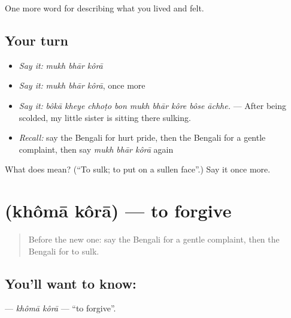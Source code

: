 \begin{grammarlens}[title={What you've built}]
One more word for describing what you lived and felt.
\end{grammarlens}

\subsection*{Your turn}
\begin{itemize}
\raggedright
  \item \emph{Say it:} \emph{mukh bhār kôrā}
  \item \emph{Say it:} \emph{mukh bhār kôrā}, once more
  \item \emph{Say it:} \emph{bôkā kheye chhoṭo bon mukh bhār kôre bôse āchhe.} — After being scolded, my little sister is sitting there sulking.
  \item \emph{Recall:} say the Bengali for hurt pride, then the Bengali for a gentle complaint, then say \emph{mukh bhār kôrā} again
\end{itemize}

\begin{tcolorbox}[breakable,colback=teal!4,colframe=teal!35!black,title={Before you move on}]
What does    mean? (\textquotedblleft{}To sulk; to put on a sullen face\textquotedblright{}.) Say it once more.
\end{tcolorbox}
\section[\texorpdfstring{\bn{ক্ষমা} \bn{করা} (khômā kôrā)}{ক্ষমা করা (khômā kôrā)}]{  (khômā kôrā) — to forgive}

\label{lesson:BN-C444-khoma-kora}



\begin{quote}
Before the new one: say the Bengali for a gentle complaint, then the Bengali for to sulk.
\end{quote}

\subsection*{You'll want to know:  }
\textbf{ } — \emph{khômā kôrā} — \textquotedblleft{}to forgive\textquotedblright{}.

\begin{quote}
      
\end{quote}

